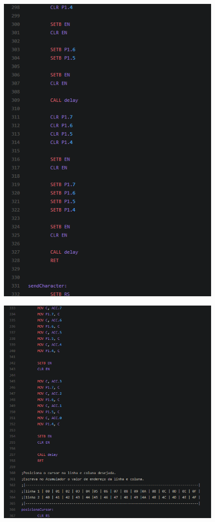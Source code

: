 \documentclass{article}
\begin{document}
\begin{figure}[H]
\hspace*{-1.0in}
\includegraphics[scale=1]{10.PNG}
\end{figure}
\begin{figure}[H]
\hspace*{-1.0in}
\includegraphics[scale=1]{11.PNG}
\end{figure}
\end{document}

